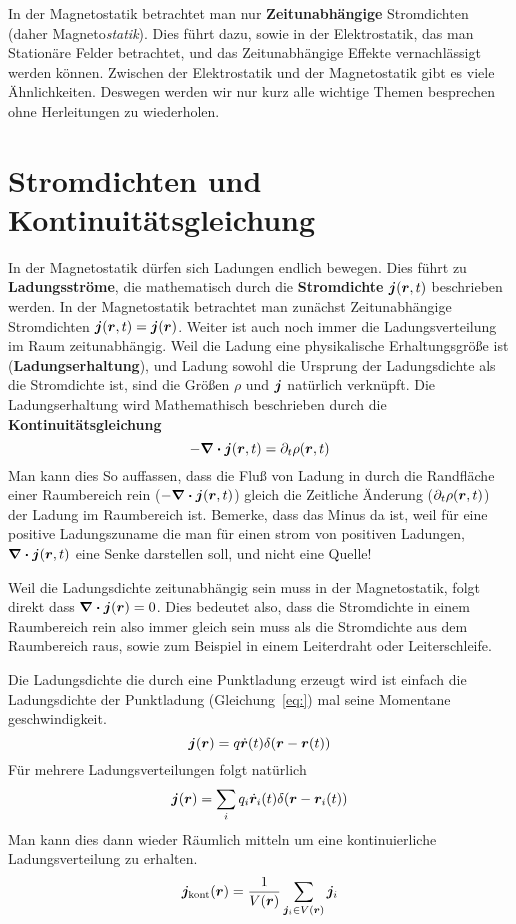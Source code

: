 In der Magnetostatik betrachtet man nur \textbf{Zeitunabhängige} Stromdichten (daher Magneto\textit{statik}). Dies führt dazu, sowie in der
Elektrostatik, das man Stationäre Felder betrachtet, und das Zeitunabhängige
Effekte vernachlässigt werden können. Zwischen der Elektrostatik und
der Magnetostatik gibt es viele Ähnlichkeiten. Deswegen werden wir nur
kurz alle wichtige Themen besprechen ohne Herleitungen zu wiederholen.

\section{Stromdichten und Kontinuitätsgleichung}%
\label{sec:stromdichten}
In der Magnetostatik dürfen sich Ladungen endlich bewegen. Dies führt zu
\textbf{Ladungsströme}, die mathematisch durch die \textbf{Stromdichte}
\(\vb*j(\vb*r, t)\) beschrieben werden. In der Magnetostatik betrachtet man
zunächst Zeitunabhängige Stromdichten $\vb*j(\vb*r, t)=\vb*j(\vb*r)$. Weiter
ist auch noch immer die Ladungsverteilung im Raum zeitunabhängig. Weil die
Ladung eine physikalische Erhaltungsgröße ist (\textbf{Ladungserhaltung}),
und Ladung sowohl die Ursprung der Ladungsdichte als die Stromdichte ist,
sind die Größen $\rho$ und $\vb*j$ natürlich verknüpft. Die Ladungserhaltung
wird Mathemathisch beschrieben durch die \textbf{Kontinuitätsgleichung}
\begin{equation}
  -\div\vb*j(\vb*r, t) = \partial_t \rho(\vb*r, t)
\end{equation}
Man kann dies So auffassen, dass die Fluß von Ladung in durch die Randfläche
einer Raumbereich rein (\(-\div\vb*j(\vb*r, t)\)) gleich die Zeitliche Änderung
(\(\partial_t\rho(\vb*r, t)\)) der Ladung im Raumbereich ist. Bemerke, dass das Minus da ist, weil für eine positive Ladungszuname die man für einen strom
von positiven Ladungen, $\div\vb*j(\vb*r, t)$ eine Senke
darstellen soll, und nicht eine Quelle!

Weil die Ladungsdichte zeitunabhängig sein muss in der Magnetostatik, folgt
direkt dass $\div\vb*j(\vb*r)=0$. Dies bedeutet also, dass die Stromdichte
in einem Raumbereich rein also immer gleich sein muss als die Stromdichte aus
dem Raumbereich raus, sowie zum Beispiel in einem Leiterdraht oder Leiterschleife.

Die Ladungsdichte die durch eine Punktladung erzeugt wird ist einfach die
Ladungsdichte der Punktladung (Gleichung~\ref{eq:}) mal seine Momentane geschwindigkeit.
\begin{equation*}
  \vb*j(\vb*r) = q \dot{\vb*r}(t) \delta(\vb*r -\vb*r(t))
\end{equation*}
Für mehrere Ladungsverteilungen folgt natürlich
\begin{equation}
  \vb*j(\vb*r) = \sum_i q_i \dot{\vb*r}_i(t) \delta(\vb*r-\vb*r_i(t))
\end{equation}
Man kann dies dann wieder Räumlich mitteln um eine kontinuierliche Ladungsverteilung zu erhalten.
\begin{equation}
  \vb*j_{\text{kont}}(\vb*r) = \frac{1}{V(\vb*r)}\sum_{\vb*j_i\in V(\vb*r)}\vb*j_i 
\end{equation}

